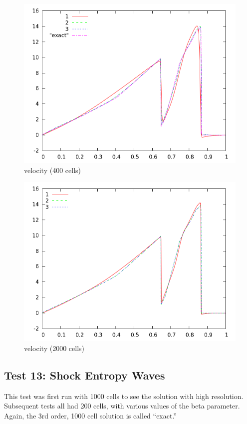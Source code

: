 \documentclass[letterpaper,12pt]{article}
\begin{document}
\begin{figure}[h]
  \begin{center}
     \includegraphics[width=.78\textwidth]{vel_T12_400.png}	
  \end{center}
  \caption{velocity (400 cells)}
\end{figure}

\begin{figure}[h]
  \begin{center}
     \includegraphics[width=.78\textwidth]{vel_T12_2000.png}	
  \end{center}
  \caption{velocity (2000 cells)}
\end{figure}

\clearpage

\subsection{Test 13: Shock Entropy Waves}

This test was first run with 1000 cells to see the solution with high resolution. Subsequent tests all had 200 cells, with various values of the beta parameter. Again, the 3rd order, 1000 cell solution is called ``exact.''
\end{document}
